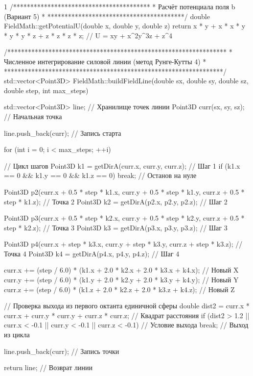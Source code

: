 \begin{listing}{1}
/****************************************
* Расчёт потенциала поля b (Вариант 5)  *
****************************************/
double FieldMath::getPotentialU(double x, double y, double z) {
  return x * y + x * x * y * y * y * z + z * z * z * z; // U = xy + x^2y^3z + z^4
}

/****************************************************************
* Численное интегрирование силовой линии (метод Рунге-Кутты 4)   *
****************************************************************/
std::vector<Point3D> FieldMath::buildFieldLine(double sx, double sy, double sz, double step, int max_steps) {
  std::vector<Point3D> line; // Хранилище точек линии
  Point3D curr(sx, sy, sz); // Начальная точка

  line.push_back(curr); // Запись старта

  for (int i = 0; i < max_steps; ++i) { // Цикл шагов
    Point3D k1 = getDirA(curr.x, curr.y, curr.z); // Шаг 1
    if (k1.x == 0 && k1.y == 0 && k1.z == 0) break; // Останов на нуле

    Point3D p2(curr.x + 0.5 * step * k1.x, curr.y + 0.5 * step * k1.y, curr.z + 0.5 * step * k1.z); // Точка 2
    Point3D k2 = getDirA(p2.x, p2.y, p2.z); // Шаг 2

    Point3D p3(curr.x + 0.5 * step * k2.x, curr.y + 0.5 * step * k2.y, curr.z + 0.5 * step * k2.z); // Точка 3
    Point3D k3 = getDirA(p3.x, p3.y, p3.z); // Шаг 3

    Point3D p4(curr.x + step * k3.x, curr.y + step * k3.y, curr.z + step * k3.z); // Точка 4
    Point3D k4 = getDirA(p4.x, p4.y, p4.z); // Шаг 4

    curr.x += (step / 6.0) * (k1.x + 2.0 * k2.x + 2.0 * k3.x + k4.x); // Новый X
    curr.y += (step / 6.0) * (k1.y + 2.0 * k2.y + 2.0 * k3.y + k4.y); // Новый Y
    curr.z += (step / 6.0) * (k1.z + 2.0 * k2.z + 2.0 * k3.z + k4.z); // Новый Z

    // Проверка выхода из первого октанта единичной сферы
    double dist2 = curr.x * curr.x + curr.y * curr.y + curr.z * curr.z; // Квадрат расстояния
    if (dist2 > 1.2 || curr.x < -0.1 || curr.y < -0.1 || curr.z < -0.1) { // Условие выхода
      break; // Выход из цикла
    }

    line.push_back(curr); // Запись точки
  }

  return line; // Возврат линии
}

\end{listing}
\normalsize
\pagebreak
